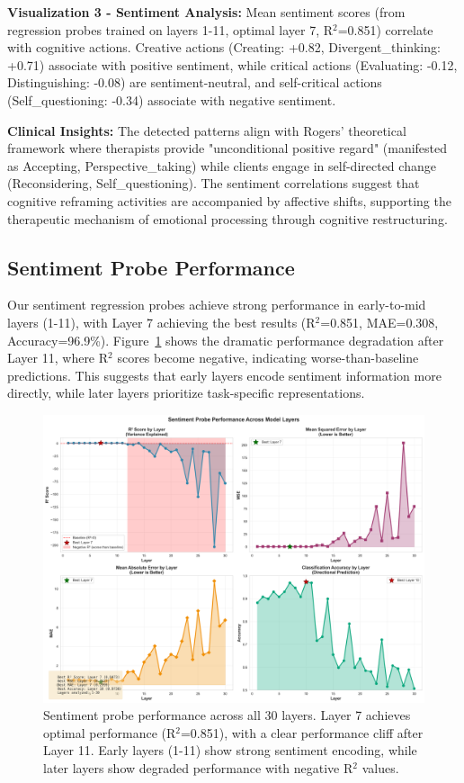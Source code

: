 \documentclass[letterpaper]{article}
\begin{document}
\textbf{Visualization 3 - Sentiment Analysis:} Mean sentiment scores (from regression probes trained on layers 1-11, optimal layer 7, R$^2$=0.851) correlate with cognitive actions. Creative actions (Creating: +0.82, Divergent\_thinking: +0.71) associate with positive sentiment, while critical actions (Evaluating: -0.12, Distinguishing: -0.08) are sentiment-neutral, and self-critical actions (Self\_questioning: -0.34) associate with negative sentiment.

\textbf{Clinical Insights:} The detected patterns align with Rogers' theoretical framework where therapists provide "unconditional positive regard" (manifested as Accepting, Perspective\_taking) while clients engage in self-directed change (Reconsidering, Self\_questioning). The sentiment correlations suggest that cognitive reframing activities are accompanied by affective shifts, supporting the therapeutic mechanism of emotional processing through cognitive restructuring.

\subsection{Sentiment Probe Performance}

Our sentiment regression probes achieve strong performance in early-to-mid layers (1-11), with Layer 7 achieving the best results (R$^2$=0.851, MAE=0.308, Accuracy=96.9\%). Figure~\ref{fig:sentiment_performance} shows the dramatic performance degradation after Layer 11, where R$^2$ scores become negative, indicating worse-than-baseline predictions. This suggests that early layers encode sentiment information more directly, while later layers prioritize task-specific representations.

\begin{figure}[t]
\centering
\includegraphics[width=\textwidth]{../data/sentiment_probe_performance.png}
\caption{Sentiment probe performance across all 30 layers. Layer 7 achieves optimal performance (R$^2$=0.851), with a clear performance cliff after Layer 11. Early layers (1-11) show strong sentiment encoding, while later layers show degraded performance with negative R$^2$ values.}
\label{fig:sentiment_performance}
\end{figure}
\end{document}
